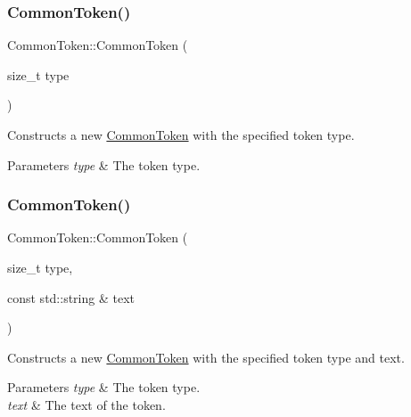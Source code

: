 \subsubsection{\texorpdfstring{Common\+Token()}{CommonToken()}\hspace{0.1cm}{\footnotesize\ttfamily [1/3]}}
{\footnotesize\ttfamily Common\+Token\+::\+Common\+Token (\begin{DoxyParamCaption}\item[{size\+\_\+t}]{type }\end{DoxyParamCaption})}

Constructs a new \hyperlink{classantlr4_1_1CommonToken}{Common\+Token} with the specified token type.


\begin{DoxyParams}{Parameters}
{\em type} & The token type. \\
\hline
\end{DoxyParams}
\mbox{\label{classantlr4_1_1CommonToken_a7da9b35d9ae9484244b5567e3bce7cb4}} 
\subsubsection{\texorpdfstring{Common\+Token()}{CommonToken()}\hspace{0.1cm}{\footnotesize\ttfamily [2/3]}}
{\footnotesize\ttfamily Common\+Token\+::\+Common\+Token (\begin{DoxyParamCaption}\item[{size\+\_\+t}]{type,  }\item[{const std\+::string \&}]{text }\end{DoxyParamCaption})}

Constructs a new \hyperlink{classantlr4_1_1CommonToken}{Common\+Token} with the specified token type and text.


\begin{DoxyParams}{Parameters}
{\em type} & The token type. \\
\hline
{\em text} & The text of the token. \\
\hline
\end{DoxyParams}
\mbox{\label{classantlr4_1_1CommonToken_a7e8aa41e9bf31b4899c18ca9302a65f4}} 
